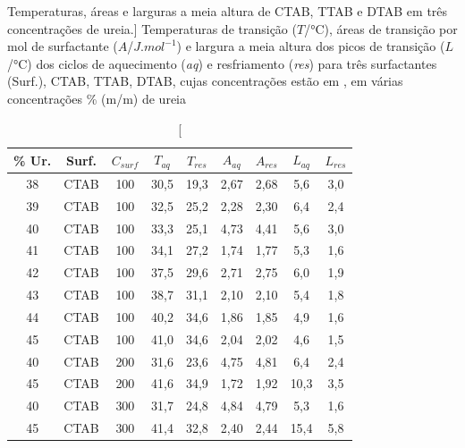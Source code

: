     \begin{table}[h]
        \IBGEtab%
        {\caption%
        	[Temperaturas, áreas e larguras a meia altura de CTAB, TTAB e DTAB em três concentrações de ureia.]%
        	{Temperaturas de transição ($T$/°C), áreas de transição por mol de surfactante ($A$/$J.mol^{-1}$) e largura a meia altura dos picos de transição ($L$/°C) dos ciclos de aquecimento (\emph{aq}) e resfriamento (\emph{res}) para três surfactantes (Surf.), CTAB, TTAB, DTAB, cujas concentrações estão em \mM, em várias concentrações \% (m/m) de ureia}
        \label{tab:DSC_temp_areas}}%
        {\begin{tabular}{ccccccccc}
            \toprule
			\% Ur. & Surf. & $C_{surf}$ & $T_{aq}$ & $T_{res}$ & $A_{aq}$ & $A_{res}$ & $L_{aq}$ & $L_{res}$ \\
			\midrule
			38     & CTAB  & 100        & 30,5     & 19,3      & 2,67     & 2,68      & 5,6      & 	3,0      \\
			39     & CTAB  & 100        & 32,5     & 25,2      & 2,28     & 2,30      & 6,4      & 	2,4      \\
			40     & CTAB  & 100        & 33,3     & 25,1      & 4,73     & 4,41      & 5,6      & 	3,0      \\
			41     & CTAB  & 100        & 34,1     & 27,2      & 1,74     & 1,77      & 5,3      & 	1,6      \\
			42     & CTAB  & 100        & 37,5     & 29,6      & 2,71     & 2,75      & 6,0      & 	1,9      \\
			43     & CTAB  & 100        & 38,7     & 31,1      & 2,10     & 2,10      & 5,4      & 	1,8      \\
			44     & CTAB  & 100        & 40,2     & 34,6      & 1,86     & 1,85      & 4,9      & 	1,6      \\
			45     & CTAB  & 100        & 41,0     & 34,6      & 2,04     & 2,02      & 4,6      & 	1,5      \\
			\midrule
			40     & CTAB  & 200        & 31,6     & 23,6      & 4,75     & 4,81      & 6,4      & 	2,4      \\
			45     & CTAB  & 200        & 41,6     & 34,9      & 1,72     & 1,92      & 10,3     & 3,5       \\
			40     & CTAB  & 300        & 31,7     & 24,8      & 4,84     & 4,79      & 5,3      & 	1,6      \\
			45     & CTAB  & 300        & 41,4     & 32,8      & 2,40     & 2,44      & 15,4     & 5,8       \\

\end{tabular}}
\end{table}

